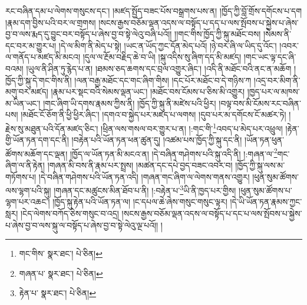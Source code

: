 རང་བཞིན་དམ་པ་ལེགས་གསུངས་དང་། །མཛད་སྤྱོད་བཟང་པོས་བསྒྲགས་པས་ན། །ཁྱོད་ཀྱི་བློ་གྲོས་དགོངས་པ་དག །རྣམ་དག་བྱིས་པའི་བར་ལ་གྲགས། །སངས་རྒྱས་བཅོམ་ལྡན་འདས་ལ་བསྟོད་པ་དད་པ་ལས་སྤོབས་པ་སྐྱེས་པ་ཞེས་བྱ་བ་ལས་རྨད་དུ་བྱུང་བར་བསྟོད་པ་ཞེས་བྱ་བ་སྟེ་ལེའུ་བཞི་པའོ།། །།གང་གིས་ཁྱོད་ཀྱི་སྐུ་མཐོང་བས། །སེམས་ནི་དང་བར་མ་གྱུར་པ། །དེ་ལ་མིག་ནི་མེད་པ་སྟེ། །ཡང་ན་ཡོད་ཀྱང་དོན་མེད་པའོ། །ཉེ་བར་ཞི་ལ་ཡིད་དུ་འོང་། །འབར་ལ་གནོད་པ་མཛད་མི་མངའ། །དུལ་ལ་རྔོམ་བརྗིད་ཆེ་བ་ཡི། །སྐུ་འདིས་སུ་ཞིག་དད་མི་མཛད། །གང་ཡང་ལྟ་དང་ཞི་བའམ། །ཡུལ་ནི་ཤིན་ཏུ་རྙེད་པ་ན། །ཐམས་ཅད་ཆགས་དང་བྲལ་འགྱུར་ཞིང་། །འདི་ནི་མཐོང་བའི་ནང་ན་མཆོག །ཁྱོད་ཀྱི་སྐུ་དེ་གང་གིས་ནི། །ལན་བརྒྱ་མཐོང་དང་གང་ཞིག་གིས། །དང་པོར་མཐོང་བ་དེ་གཉིས་ཀ །འདྲ་བར་མིག་ནི་མགུ་བར་མཛད། །རྣམ་པར་སྡང་བའི་སེམས་ལྡན་ཡང་། །མཐོང་བས་ངོམས་པ་ཅིས་མི་འགྱུར། །ཁྱད་པར་ལ་མཁས་མ་ཡིན་ཡང་། །གང་ཞིག་ཡི་དགས་རྣམས་ཀྱིས་ནི། །ཁྱོད་ཀྱི་སྐུ་ནི་མཛེས་པའི་ཕྱིར། །བལྟ་བས་མི་ངོམས་རང་བཞིན་པས། །མཐོང་ངོ་ཅོག་ནི་ཕྱི་ཕྱིར་ཞིང་། །དགའ་བ་སྐྱེད་པར་མཛད་པ་ལགས། །དུབ་པར་མ་དགོངས་ངོ་མཚར་ཏེ། །རྗེས་སུ་མཐུན་པའི་དོན་མཛད་ཅིང་། །ཕྲིན་ལས་གསལ་བར་གྱུར་པ་ན། །:གང་གི་\footnote{གང་གིས་  སྣར་ཐང་།  པེ་ཅིན། }འབད་པ་མེད་པར་འཕྲུལ། །རྟེན་གྱི་ཡོན་ཏན་དག་དང་ནི། །བརྟེན་པའི་ཡོན་ཏན་ཕན་ཚུན་དུ། །འཚམ་པས་ཁྱོད་ཀྱི་སྐུ་དང་ནི། །ཡོན་ཏན་ཕུན་ཚོགས་མཆོག་དང་ལྡན། །ཁྱོད་ལ་ཡོན་ཏན་མི་མངའ་ན། །དེ་བཞིན་གཤེགས་པའི་སྐུ་འདི་ནི། །:གཞན་ལ་\footnote{གཞན་པ་  སྣར་ཐང་།  པེ་ཅིན། }གང་ཞིག་ལ་ནི་རྟེན། །གཞན་མི་བས་ནི་རྣམ་པར་སྤྲས། །མཚན་དང་དཔེ་བྱད་བཟང་འབར་བ། །ཁྱོད་ཀྱི་སྐུ་ལས་མ་གཏོགས་པ། །དེ་བཞིན་གཤེགས་པའི་ཡོན་ཏན་འདི། །གཞན་གང་ཞིག་ལ་ལེགས་གནས་འགྱུར། །ཕུན་སུམ་ཚོགས་ལས་ལྷག་པའི་སྐུ། །གཞན་དང་མཚུངས་མིན་ཐོབ་པ་ནི། །:བརྟེན་པ་\footnote{རྟེན་པ་  སྣར་ཐང་།  པེ་ཅིན། }ཡི་ནི་ཁྱད་པར་གྱིས། །ཕུན་སུམ་ཚོགས་པ་ལྷག་པར་འཆང་། །ཁྱོད་སྐུ་རྟེན་པའི་ཡོན་ཏན་ལ། །ང་དཔལ་ཆེ་ཞེས་གསུང་གསུང་ལྟར། །དེ་ཡི་ཡོན་ཏན་རྣམས་ཀྱང་སླར། །ངེད་ལེགས་བཀོད་ཅེས་གསུང་བ་འདྲ། །སངས་རྒྱས་བཅོམ་ལྡན་འདས་ལ་བསྟོད་པ་དང་པ་ལས་སྤོབས་པ་སྐྱེས་པ་ཞེས་བྱ་བ་ལས་སྐུ་ལ་བསྟོད་པ་ཞེས་བྱ་བ་སྟེ་ལེའུ་ལྔ་པའོ།། །

